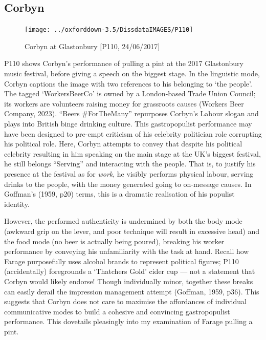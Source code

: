 \documentclass[a4paper, nobind]{templates/ociamthesis}
\begin{document}
\hypertarget{corbyn-1}{%
\subsection*{Corbyn}\label{corbyn-1}}

\begin{figure}
\texttt{[image: ../oxforddown-3.5/DissdataIMAGES/P110]} \caption{Corbyn at Glastonbury [P110, 24/06/2017]}\label{fig:unnamed-chunk-21}
\end{figure}

P110 shows Corbyn's performance of pulling a pint at the 2017 Glastonbury music festival, before giving a speech on the biggest stage. In the linguistic mode, Corbyn captions the image with two references to his belonging to `the people'. The tagged `WorkersBeerCo' is owned by a London-based Trade Union Council; its workers are volunteers raising money for grassroots causes (Workers Beer Company, 2023). ``Beers \#ForTheMany'' repurposes Corbyn's Labour slogan and plays into British binge drinking culture. This gastropopulist performance may have been designed to pre-empt criticism of his celebrity politician role corrupting his political role. Here, Corbyn attempts to convey that despite his political celebrity resulting in him speaking on the main stage at the UK's biggest festival, he still belongs ``Serving'' and interacting with the people. That is, to justify his presence at the festival as for \emph{work}, he visibly performs physical labour, serving drinks to the people, with the money generated going to on-message causes. In Goffman's (1959, p20) terms, this is a dramatic realisation of his populist identity.

However, the performed authenticity is undermined by both the body mode (awkward grip on the lever, and poor technique will result in excessive head) and the food mode (no beer is actually being poured), breaking his worker performance by conveying his unfamiliarity with the task at hand. Recall how Farage purposefully uses alcohol brands to represent political figures; P110 (accidentally) foregrounds a `Thatchers Gold' cider cup --- not a statement that Corbyn would likely endorse! Though individually minor, together these breaks can easily derail the impression management attempt (Goffman, 1959, p36). This suggests that Corbyn does not care to maximise the affordances of individual communicative modes to build a cohesive and convincing gastropopulist performance. This dovetails pleasingly into my examination of Farage pulling a pint.
\end{document}
